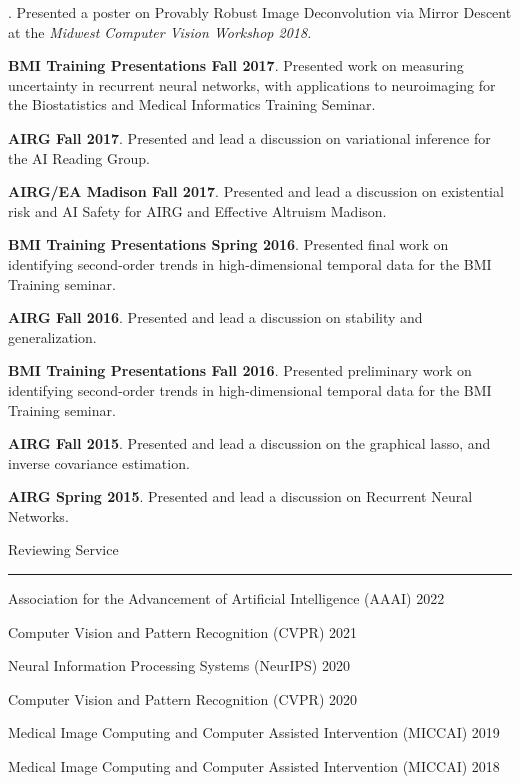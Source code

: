 \documentclass[]{article}
\begin{document}
. Presented a poster on Provably Robust Image Deconvolution via Mirror Descent at the \textit{Midwest Computer Vision Workshop 2018.}

\noindent \textbf{BMI Training Presentations Fall 2017}. Presented work on measuring uncertainty in recurrent neural networks, with applications to neuroimaging for the Biostatistics and Medical Informatics Training Seminar.

\noindent \textbf{AIRG Fall 2017}. Presented and lead a discussion on variational inference for the AI Reading Group.

\noindent \textbf{AIRG/EA Madison Fall 2017}. Presented and lead a discussion on existential risk and AI Safety for AIRG and Effective Altruism Madison.

\noindent \textbf{BMI Training Presentations Spring 2016}. Presented final work on identifying second-order trends in high-dimensional temporal data for the BMI Training seminar.

\noindent \textbf{AIRG Fall 2016}. Presented and lead a discussion on stability and generalization.

\noindent \textbf{BMI Training Presentations Fall 2016}. Presented preliminary work on identifying second-order trends in high-dimensional temporal data for the BMI Training seminar.

\noindent \textbf{AIRG Fall 2015}. Presented and lead a discussion on the graphical lasso, and inverse covariance estimation.

\noindent \textbf{AIRG Spring 2015}. Presented and lead a discussion on Recurrent Neural Networks.

\vspace{20pt}
{\LARGE Reviewing Service}
\vspace{3pt}
\hrule
\vspace{10pt}

\noindent Association for the Advancement of Artificial Intelligence (AAAI) \hfill 2022

\noindent Computer Vision and Pattern Recognition (CVPR) \hfill 2021

\noindent Neural Information Processing Systems (NeurIPS) \hfill 2020

\noindent Computer Vision and Pattern Recognition (CVPR) \hfill 2020

\noindent Medical Image Computing and Computer Assisted Intervention (MICCAI) \hfill 2019

\noindent Medical Image Computing and Computer Assisted Intervention (MICCAI) \hfill 2018
\end{document}
